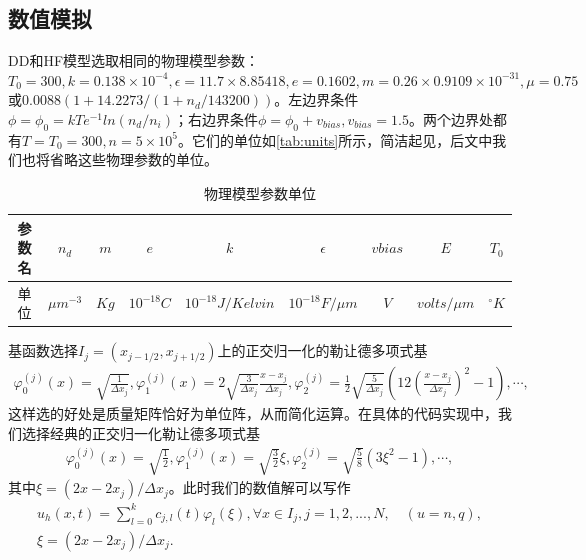 \subsection{数值模拟}
DD和HF模型选取相同的物理模型参数：$T_0 = 300, k = 0.138 \times 10^{-4}, \epsilon = 11.7\times 8.85418, e = 0.1602, m = 0.26\times0.9109\times 10^{-31}, \mu = 0.75 $或$0.0088(1+14.2273/(1+n_d/143200))$。左边界条件$\phi=\phi_0=kTe^{-1}ln(n_d/n_i)$；右边界条件$\phi = \phi_0+v_{bias}, v_{bias}=1.5$。两个边界处都有$T=T_0 = 300, n = 5\times 10^5$。它们的单位如\autoref{tab:units}所示\cite{cercignani2000deviceb}，简洁起见，后文中我们也将省略这些物理参数的单位。
\begin{table}[htbp]
    \centering
    \begin{tabular}{ccccccccc}
        \hline
        参数名 & $n_d$        & $m$  & $e$         & $k$                & $\epsilon$        & $vbias$ & $E$           & $T_0$      \\
        \hline
        单位   & $\mu m^{-3}$ & $Kg$ & $10^{-18}C$ & $10^{-18}J/Kelvin$ & $10^{-18}F/\mu m$ & $V$     & $volts/\mu m$ & $^\circ K$ \\
        \hline
    \end{tabular}
    \caption{物理模型参数单位}
    \label{tab:units}
\end{table}

基函数选择$I_j = (x_{j-1/2}, x_{j+1/2})$上的正交归一化的勒让德多项式基
\begin{align*}
    \varphi_0^{(j)}(x) = \sqrt{\frac{1}{\Delta x_j}}, \varphi_1^{(j)}(x) = 2\sqrt{\frac{3}{\Delta x_j}}\frac{x-x_j}{\Delta x_j}, \varphi_2^{(j)} =\frac{1}{2}\sqrt{\frac{5}{\Delta x_j}}(12(\frac{x-x_j}{\Delta x_j})^2 - 1 ), \cdots,
\end{align*}
这样选的好处是质量矩阵恰好为单位阵，从而简化运算。在具体的代码实现中，我们选择经典的正交归一化勒让德多项式基
\begin{align*}
    \varphi_0^{(j)}(x) = \sqrt{\frac{1}{2}}, \varphi_1^{(j)}(x) = \sqrt{\frac{3}{2}}\xi, \varphi_2^{(j)} =\sqrt{\frac{5}{8}}(3\xi^2- 1 ), \cdots,
\end{align*}
其中$\xi = (2x-2x_j)/\Delta x_j$。此时我们的数值解可以写作
\begin{align*}
    u_h(x,t) = \sum_{l=0}^k c_{j,l}(t)\varphi_{l}(\xi), \forall x \in I_j , j= 1,2,...,N, \quad (u = n,q), \\
    \xi = (2x-2x_j)/\Delta x_j.
\end{align*}

